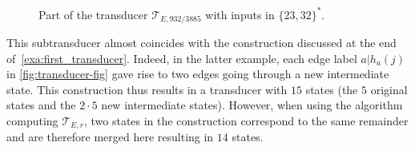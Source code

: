 \documentclass[12pt,reqno]{amsart}
\begin{document}
\begin{example}
\begin{figure}[ht]
\begin{center}
\end{center}
\caption{Part of the transducer $\mathcal{T}_{E,932/3885}$ with inputs in $\{23,32\}^*$.}
\label{fig:180}
\end{figure}


This subtransducer almost coincides with the construction discussed at the end of~\cref{exa:first_transducer}. Indeed, in the latter example, each edge label $a|h_a(j)$  in \cref{fig:transducer-fig} gave rise to two edges going through a new intermediate state. This construction thus results in a transducer with $15$ states (the $5$ original states and the $2\cdot 5$ new intermediate states). However, when using the algorithm computing $\mathcal{T}_{E,r}$, two states in the construction correspond to the same remainder and are therefore merged here resulting in $14$ states.
\end{example}
\end{document}
